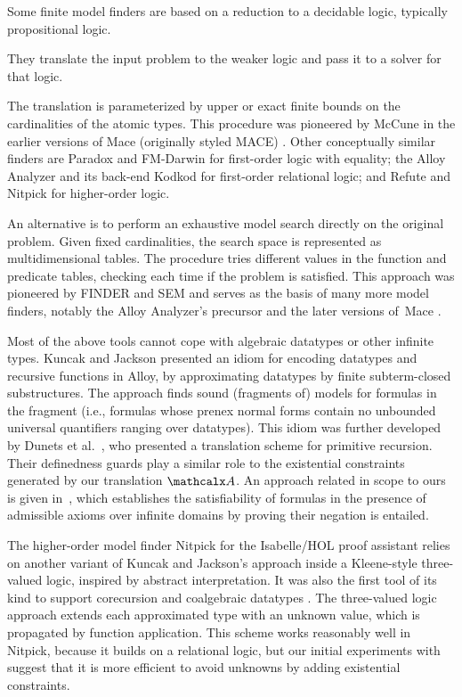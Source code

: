 Some finite model finders are based on a reduction to a decidable logic,
typically propositional logic. \begin{rep}They translate the input problem to the weaker
logic and pass it to a solver for that logic.\end{rep}
The translation is parameterized by upper or exact finite bounds on
the cardinalities of the atomic types. This procedure was pioneered by McCune
in the earlier versions of Mace (originally styled MACE) \cite{mccune-1994}.
Other conceptually similar finders are Paradox \cite{claessen-sorensson-2003}
and FM-Darwin \cite{baumgartner-et-al-2009} for first-order logic with
equality; the Alloy Analyzer and its back-end Kodkod \cite{torlak-jackson-2007}
for first-order relational logic; and Refute \cite{weber-2008} and Nitpick
\cite{blanchette-nipkow-2010} for higher-order logic.

An alternative is to perform
an exhaustive model search directly on the original problem. Given fixed
cardinalities, the search space is represented as multidimensional
tables. The procedure tries different values in the function and predicate
tables, checking each time if the problem is satisfied.
This approach was pioneered by FINDER
\cite{slaney-1994} and SEM \cite{zhang-zhang-1995} and serves as
the basis of many more model finders, notably the Alloy Analyzer's precursor
\cite{jackson-1996} and the later versions of~Mace
\cite{mccune-prover9-mace4}.

Most of the above tools cannot cope with algebraic datatypes or other infinite
types.
Kuncak and Jackson \cite{kuncak-jackson-2005} presented an idiom for
encoding datatypes and recursive functions in Alloy, by approximating datatypes
by finite subterm-closed substructures. The approach finds sound (fragments
of) models for formulas in the  fragment 
(i.e., formulas whose prenex normal forms contain no unbounded universal
quantifiers ranging over datatypes). This idiom was further developed by Dunets
et al.\ \cite{dunets-et-al-2010}, who presented a translation scheme
for primitive recursion. Their definedness guards play a similar role to the
existential constraints generated by our translation $\conv$.
An approach related in scope to ours is given in~\cite{baumgartner2013},
which establishes the satisfiability of formulas in the presence of admissible
axioms over infinite domains by proving their negation is entailed.

The higher-order model finder Nitpick \cite{blanchette-nipkow-2010}
for the Isabelle/HOL proof assistant
relies on another variant of Kuncak and Jackson's approach inside a
Kleene-style three-valued logic, inspired by abstract interpretation.
It was also the first tool of its kind to support corecursion and
coalgebraic datatypes \cite{blanchette-2013-relational}.
The three-valued logic approach extends each
approximated type with an unknown value, which is propagated by function
application. This scheme works reasonably well in Nitpick, because it builds
on a relational logic, but our initial experiments with \cvc suggest
that it is more efficient to avoid unknowns by adding existential
constraints.

